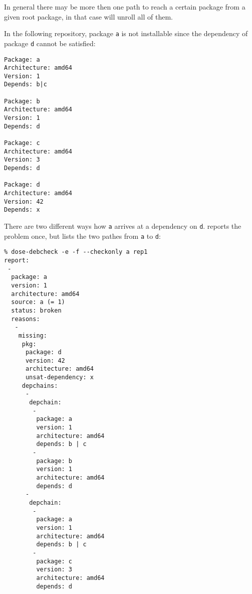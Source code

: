 In general there may be more then one path to reach a certain package
from a given root package, in that case \debcheck{} will unroll all of
them.
\begin{example}
In the following repository, package \texttt{a} is not installable since 
the dependency of package \texttt{d} cannot be satisfied:
\begin{verbatim}
Package: a
Architecture: amd64
Version: 1
Depends: b|c

Package: b
Architecture: amd64
Version: 1
Depends: d

Package: c
Architecture: amd64
Version: 3
Depends: d

Package: d
Architecture: amd64
Version: 42
Depends: x
\end{verbatim}
There are two different ways how \texttt{a} arrives at a dependency on
\texttt{d}. \debcheck{} reports the problem once, but lists the two pathes 
from \texttt{a} to \texttt{d}:
\begin{verbatim}
% dose-debcheck -e -f --checkonly a rep1
report:
 -
  package: a
  version: 1
  architecture: amd64
  source: a (= 1)
  status: broken
  reasons:
   -
    missing:
     pkg:
      package: d
      version: 42
      architecture: amd64
      unsat-dependency: x
     depchains:
      -
       depchain:
        -
         package: a
         version: 1
         architecture: amd64
         depends: b | c
        -
         package: b
         version: 1
         architecture: amd64
         depends: d
      -
       depchain:
        -
         package: a
         version: 1
         architecture: amd64
         depends: b | c
        -
         package: c
         version: 3
         architecture: amd64
         depends: d
\end{verbatim}
\end{example}



